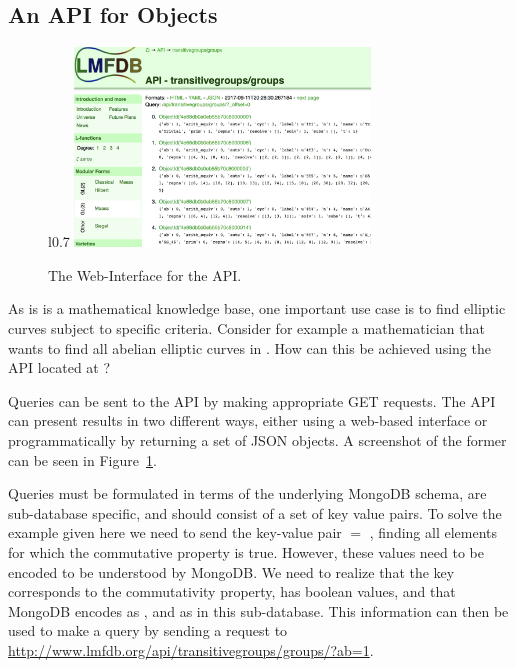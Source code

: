 \subsection{An API for \lmfdb Objects}\label{sec:sota:api}

\begin{figure}l{0.7\textwidth}\centering
  \includegraphics[width=0.7\textwidth]{APIScreenshot.png}
  \caption[The Web-Interface for the \lmfdb API. ]{
    The Web-Interface for the \lmfdb API. 
  }
  \label{fig:apiscreenshot}
\end{figure}
As \lmfdb is is a mathematical knowledge base, one important use case is to find elliptic curves subject to specific criteria. 
Consider for example a mathematician that wants to find all abelian elliptic curves in \lmfdb. 
How can this be achieved using the \lmfdb API located at \cite{lmfdbapi}? 

Queries can be sent to the API by making appropriate GET requests. 
The \lmfdb API can present results in two different ways, either using a web-based interface or programmatically by returning a set of JSON objects. 
A screenshot of the former can be seen in Figure~\ref{fig:apiscreenshot}. 

Queries must be formulated in terms of the underlying MongoDB schema, are sub-database specific, and should consist of a set of key value pairs. 
To solve the example given here we need to send the key-value pair $ = $ , finding all elements for which the commutative property is true. 
However, these values need to be encoded to be understood by MongoDB. 
We need to realize that the  key corresponds to the commutativity property, has boolean values, and that MongoDB encodes  as , and  as  in this \lmfdb sub-database. 
This information can then be used to make a query by sending a request to \url{http://www.lmfdb.org/api/transitivegroups/groups/?ab=1}. 

